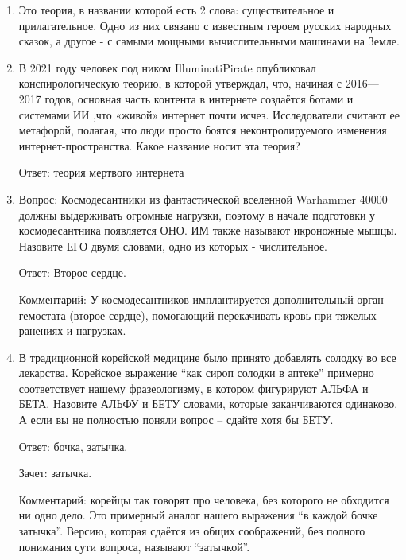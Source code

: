 \documentclass[oneside,final,14pt]{extreport}
\begin{document}
\begin{enumerate}
    Ответ: Формула Лоренца-Лоренца

    Комментарий: фамилия датского физика тоже была Лоренц

    \item Это теория, в названии которой есть 2 слова: существительное и прилагательное. Одно из них связано с известным героем русских народных сказок, а другое - с самыми мощными вычислительными машинами на Земле.

    \item В 2021 году человек под ником IlluminatiPirate опубликовал конспирологическую теорию, в которой утверждал, что, начиная с 2016—2017 годов, основная часть контента в интернете создаётся ботами и системами ИИ ,что «живой» интернет почти исчез. Исследователи считают ее метафорой, полагая, что люди просто боятся неконтролируемого изменения интернет-пространства. Какое название носит эта теория?

    Ответ: теория мертвого интернета

    \item Вопрос: Космодесантники из фантастической вселенной Warhammer 40000 должны выдерживать огромные нагрузки, поэтому в начале подготовки у космодесантника появляется ОНО. ИМ также называют икроножные мышцы. Назовите ЕГО двумя словами, одно из которых - числительное.

    Ответ: Второе сердце.

    Комментарий: У космодесантников имплантируется дополнительный орган — гемостата (второе сердце), помогающий перекачивать кровь при тяжелых ранениях и нагрузках.

    \item В традиционной корейской медицине было принято добавлять солодку во все лекарства. Корейское выражение “как сироп солодки в аптеке” примерно соответствует нашему фразеологизму, в котором фигурируют АЛЬФА и БЕТА. Назовите АЛЬФУ и БЕТУ словами, которые заканчиваются одинаково. А если вы не полностью поняли вопрос – сдайте хотя бы БЕТУ.

    Ответ: бочка, затычка.

    Зачет: затычка.

    Комментарий: корейцы так говорят про человека, без которого не обходится ни одно дело. Это примерный аналог нашего выражения “в каждой бочке затычка”. Версию, которая сдаётся из общих соображений, без полного понимания сути вопроса, называют “затычкой”.
\end{enumerate}
\end{document}
